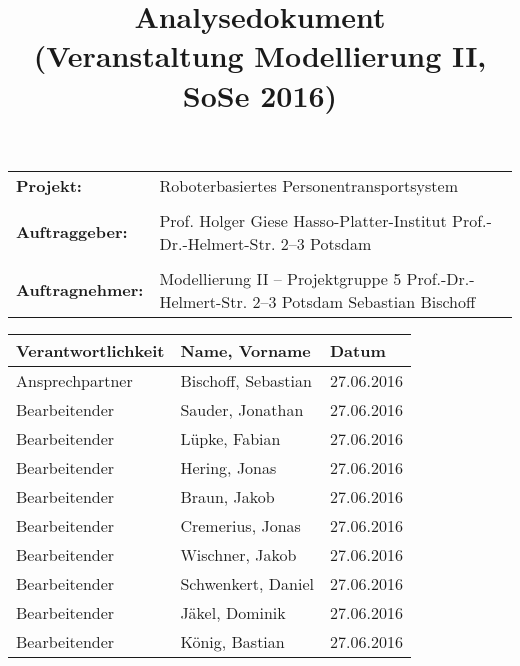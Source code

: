 \documentclass[includeheaders]{scrartcl}
\begin{document}


\newpage 

\title{Analysedokument\\ \small{(Veranstaltung Modellierung II, SoSe 2016)}}
\date{}
\author{}

\maketitle
\begin{table}[H]
	\centering
	\begin{tabular}{lp{7.5cm}}
		\textbf{Projekt:} & Roboterbasiertes Personentransportsystem\\
		&\\
		\textbf{Auftraggeber: }& Prof. Holger Giese \newline Hasso-Platter-Institut \newline Prof.-Dr.-Helmert-Str. 2–3 \newline 14482 Potsdam\\
		&\\
		\textbf{Auftragnehmer: }& Modellierung II – Projektgruppe 5 \newline Prof.-Dr.-Helmert-Str. 2–3 \newline 14482 Potsdam \newline Sebastian Bischoff\\ 
	\end{tabular}
\end{table}
 
\newpage

\begin{table}[H]
	\centering
	\begin{tabularx}{\textwidth}{|p{4cm}|X|p{4cm}|}
		\hline
		Verantwortlichkeit & Name, Vorname & Datum \\ \hline
		Ansprechpartner    & Bischoff, Sebastian & 27.06.2016 \\
		Bearbeitender      & Sauder, Jonathan & 27.06.2016 \\ 
		Bearbeitender      & Lüpke, Fabian & 27.06.2016 \\ 
		Bearbeitender      & Hering, Jonas & 27.06.2016 \\
		Bearbeitender      & Braun, Jakob & 27.06.2016  \\
		Bearbeitender      & Cremerius, Jonas & 27.06.2016 \\
		Bearbeitender      & Wischner, Jakob & 27.06.2016 \\
		Bearbeitender      & Schwenkert, Daniel & 27.06.2016 \\
		Bearbeitender      & Jäkel, Dominik & 27.06.2016 \\
		Bearbeitender      & König, Bastian & 27.06.2016 \\ \hline
	\end{tabularx}
\end{table}

\newpage

\tableofcontents

\newpage








\end{document}
